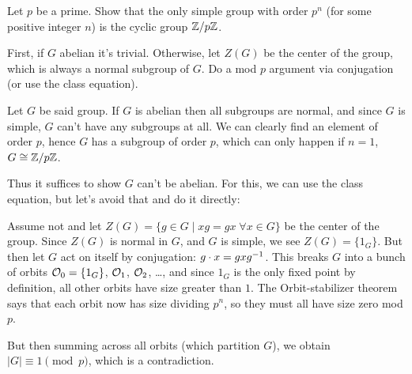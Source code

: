\begin{problem}
	\yod
	Let $p$ be a prime.
	Show that the only simple group with order $p^n$
	(for some positive integer $n$)
	is the cyclic group $\mathbb Z/p\mathbb Z$.

	\begin{hint}
		First, if $G$ abelian it's trivial.
		Otherwise, let $Z(G)$ be the center of the group,
		which is always a normal subgroup of $G$.
		Do a mod $p$ argument via conjugation (or use the class equation).
	\end{hint}
	\begin{sol}
		Let $G$ be said group.
		If $G$ is abelian then all subgroups are normal,
		and since $G$ is simple, $G$ can't have any subgroups at all.
		We can clearly find an element of order $p$, hence $G$ has a subgroup
		of order $p$, which can only happen if $n=1$, $G \cong \mathbb Z/p\mathbb Z$.

		Thus it suffices to show $G$ can't be abelian.
		For this, we can use the class equation, but let's avoid that and do it directly:

		Assume not and let $Z(G) = \{ g \in G \mid xg = gx \; \forall x \in G \}$
		be the center of the group.
		Since $Z(G)$ is normal in $G$, and $G$ is simple, we see $Z(G) = \{1_G\}$.
		But then let $G$ act on itself by conjugation: $g \cdot x = gxg^{-1}$.
		This breaks $G$ into a bunch of orbits $\mathcal O_0 = \{1_G\}$, $\mathcal O_1$, $\mathcal O_2$, \dots,
		and since $1_G$ is the only fixed point by definition, all other orbits
		have size greater than $1$.
		The Orbit-stabilizer theorem says that each orbit now has size dividing $p^n$,
		so they must all have size zero mod $p$.

		But then summing across all orbits (which partition $G$),
		we obtain $\left\lvert G \right\rvert \equiv 1 \pmod p$,
		which is a contradiction.
	\end{sol}
\end{problem}
